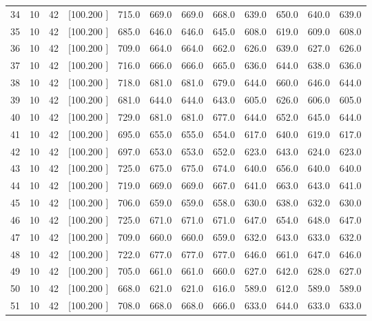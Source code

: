 \documentclass[12pt,a4paper]{article}
\begin{document}
\begin{center}
{\begin{tabular}{r r r r r r r r r r r r}
  34& 10& 42&[100.200   ]&   715.0&   669.0&   669.0&   668.0&   639.0&   650.0&   640.0&   639.0\\[-0.02in]
  35& 10& 42&[100.200   ]&   685.0&   646.0&   646.0&   645.0&   608.0&   619.0&   609.0&   608.0\\[-0.02in]
  36& 10& 42&[100.200   ]&   709.0&   664.0&   664.0&   662.0&   626.0&   639.0&   627.0&   626.0\\[-0.02in]
  37& 10& 42&[100.200   ]&   716.0&   666.0&   666.0&   665.0&   636.0&   644.0&   638.0&   636.0\\[-0.02in]
  38& 10& 42&[100.200   ]&   718.0&   681.0&   681.0&   679.0&   644.0&   660.0&   646.0&   644.0\\[-0.02in]
  39& 10& 42&[100.200   ]&   681.0&   644.0&   644.0&   643.0&   605.0&   626.0&   606.0&   605.0\\[-0.02in]
  40& 10& 42&[100.200   ]&   729.0&   681.0&   681.0&   677.0&   644.0&   652.0&   645.0&   644.0\\[-0.02in]
  41& 10& 42&[100.200   ]&   695.0&   655.0&   655.0&   654.0&   617.0&   640.0&   619.0&   617.0\\[-0.02in]
  42& 10& 42&[100.200   ]&   697.0&   653.0&   653.0&   652.0&   623.0&   643.0&   624.0&   623.0\\[-0.02in]
  43& 10& 42&[100.200   ]&   725.0&   675.0&   675.0&   674.0&   640.0&   656.0&   640.0&   640.0\\[-0.02in]
  44& 10& 42&[100.200   ]&   719.0&   669.0&   669.0&   667.0&   641.0&   663.0&   643.0&   641.0\\[-0.02in]
  45& 10& 42&[100.200   ]&   706.0&   659.0&   659.0&   658.0&   630.0&   638.0&   632.0&   630.0\\[-0.02in]
  46& 10& 42&[100.200   ]&   725.0&   671.0&   671.0&   671.0&   647.0&   654.0&   648.0&   647.0\\[-0.02in]
  47& 10& 42&[100.200   ]&   709.0&   660.0&   660.0&   659.0&   632.0&   643.0&   633.0&   632.0\\[-0.02in]
  48& 10& 42&[100.200   ]&   722.0&   677.0&   677.0&   677.0&   646.0&   661.0&   647.0&   646.0\\[-0.02in]
  49& 10& 42&[100.200   ]&   705.0&   661.0&   661.0&   660.0&   627.0&   642.0&   628.0&   627.0\\[-0.02in]
  50& 10& 42&[100.200   ]&   668.0&   621.0&   621.0&   616.0&   589.0&   612.0&   589.0&   589.0\\[-0.02in]
  51& 10& 42&[100.200   ]&   708.0&   668.0&   668.0&   666.0&   633.0&   644.0&   633.0&   633.0\\[-0.02in]

\end{tabular}}
\end{center}
\end{document}

